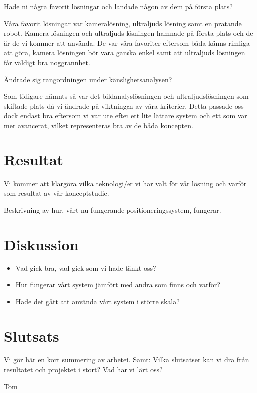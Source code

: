 \documentclass[11pt, a4paper]{report}
\begin{document}
Hade ni några favorit lösningar och landade någon av dem på första plats?

Våra favorit lösningar var kameralösning, ultraljuds lösning samt en pratande robot. Kamera lösningen och ultraljuds lösningen hamnade på första plats och de är de vi kommer att använda. De var våra favoriter eftersom båda känns rimliga att göra, kamera lösningen bör vara ganska enkel samt att ultraljuds lösningen får väldigt bra noggrannhet.

Ändrade sig rangordningen under känslighetsanalysen?

Som tidigare nämnts så var det bildanalyslösningen och ultraljudslösningen som skiftade plats då vi ändrade på viktningen av våra kriterier. Detta passade oss dock endast bra eftersom vi var ute efter ett lite lättare system och ett som var mer avancerat, vilket representeras bra av de båda koncepten. 


\chapter{Resultat}
Vi kommer att klargöra vilka teknologi/er vi har valt för vår lösning och varför som resultat av vår konceptstudie.

Beskrivning av hur, vårt nu fungerande positioneringssystem, fungerar. 

\chapter{Diskussion}
\begin{itemize}
\item Vad gick bra, vad gick som vi hade tänkt oss?
\item Hur fungerar vårt system jämfört med andra som finns och varför?
\item Hade det gått att använda vårt system i större skala?
\end{itemize} 




\chapter{Slutsats}
Vi gör här en kort summering av arbetet.
Samt:
Vilka slutsatser kan vi dra från resultatet och projektet i stort?
Vad har vi lärt oss?






\newpage
\begin{thebibliography}{99}

 Tom

\end{thebibliography}
\end{document}
